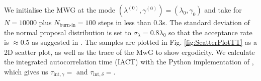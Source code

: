 We initialise the MWG at the mode $( \lambda^{(0)} , \gamma^{(0)}  ) = ( \lambda_{0} , \gamma_{0}  )$ and take for $N = 10000$ plus $N_{\text{burn-in}} = 100$ steps in less than $0.3$s.
The standard deviation of the normal proposal distribution is set to $\sigma_{\lambda} = 0.8 \lambda_0$ so that the acceptance rate is $\approx 0.5$ as suggested in \cite{}.
The samples are plotted in Fig. \ref{fig:ScatterPlotTT} as a 2D scatter plot, as well as the trace of the MwG to show ergodicity.
We calculate the integrated autocorrelation time (IACT) with the Python implementation of \cite{}, which gives us $\tau_{\text{int}, \gamma} = $ and $\tau_{\text{int}, \delta} = $.

